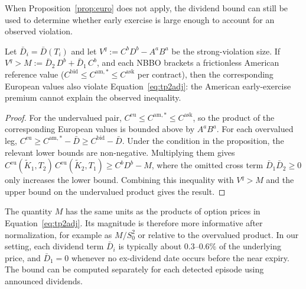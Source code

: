 \documentclass[sigconf,review,anonymous]{acmart}
\begin{document}
When Proposition~\ref{prop:euro} does not apply, the dividend bound can still be used to determine whether early exercise is large enough to account for an observed violation.

\begin{proposition}\label{prop:cert}
Let $\bar D_i=\bar D(T_i)$ and let $V^q:=C^bD^b-A^aB^a$ be the strong-violation size. If $V^q>M:=\bar D_2\,D^{b}+\bar D_1\,C^{b}$, and each NBBO brackets a frictionless American reference value ($C^{\mathrm{bid}}\le C^{\mathrm{am},*}\le C^{\mathrm{ask}}$ per contract), then the corresponding European values also violate Equation~\eqref{eq:tp2adj}: the American early-exercise premium cannot explain the observed inequality.
\end{proposition}
\begin{proof}
For the undervalued pair,
$C^{\mathrm{eu}}\le C^{\mathrm{am},*}\le C^{\mathrm{ask}}$,
so the product of the corresponding European values is bounded above by $A^aB^a$. For each overvalued leg, $C^{\mathrm{eu}}\ge C^{\mathrm{am},*}-\bar D\ge C^{\mathrm{bid}}-\bar D$. Under the condition in the proposition, the relevant lower bounds are non-negative. Multiplying them gives $C^{\mathrm{eu}}(\tilde K_1,T_2)\,C^{\mathrm{eu}}(\tilde K_2,T_1)\ge C^bD^b-M$, where the omitted cross term $\bar D_1\bar D_2\ge0$ only increases the lower bound. Combining this inequality with $V^q>M$ and the upper bound on the undervalued product gives the result.
\end{proof}
\noindent
The quantity $M$ has the same units as the products of option prices in Equation~\eqref{eq:tp2adj}. Its magnitude is therefore more informative after normalization, for example as $M/S_0^2$ or relative to the overvalued product. In our setting, each dividend term $\bar D_i$ is typically about $0.3$--$0.6\%$ of the underlying price, and $\bar D_1=0$ whenever no ex-dividend date occurs before the near expiry. The bound can be computed separately for each detected episode using announced dividends.
\end{document}

